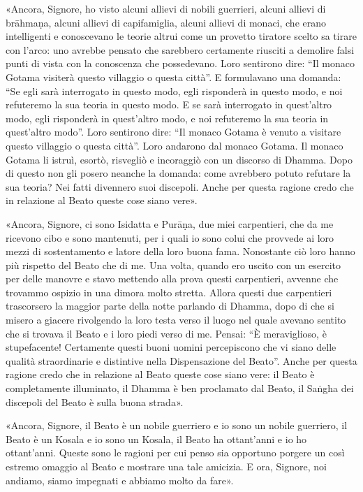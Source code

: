 «Ancora, Signore, ho visto alcuni allievi di nobili guerrieri, alcuni allievi di
brāhmaṇa, alcuni allievi di capifamiglia, alcuni allievi di monaci, che erano
intelligenti e conoscevano le teorie altrui come un provetto tiratore scelto sa
tirare con l’arco: uno avrebbe pensato che sarebbero certamente riusciti a
demolire falsi punti di vista con la conoscenza che possedevano. Loro sentirono
dire: “Il monaco Gotama visiterà questo villaggio o questa città”. E formulavano
una domanda: “Se egli sarà interrogato in questo modo, egli risponderà in questo
modo, e noi refuteremo la sua teoria in questo modo. E se sarà interrogato in
quest’altro modo, egli risponderà in quest’altro modo, e noi refuteremo la sua
teoria in quest’altro modo”. Loro sentirono dire: “Il monaco Gotama è venuto a
visitare questo villaggio o questa città”. Loro andarono dal monaco Gotama. Il
monaco Gotama li istruì, esortò, risvegliò e incoraggiò con un discorso di
Dhamma. Dopo di questo non gli posero neanche la domanda: come avrebbero potuto
refutare la sua teoria? Nei fatti divennero suoi discepoli. Anche per questa
ragione credo che in relazione al Beato queste cose siano vere».

«Ancora, Signore, ci sono Isidatta e Purāṇa, due miei carpentieri, che da me
ricevono cibo e sono mantenuti, per i quali io sono colui che provvede ai loro
mezzi di sostentamento e latore della loro buona fama. Nonostante ciò loro hanno
più rispetto del Beato che di me. Una volta, quando ero uscito con un esercito
per delle manovre e stavo mettendo alla prova questi carpentieri, avvenne che
trovammo ospizio in una dimora molto stretta. Allora questi due carpentieri
trascorsero la maggior parte della notte parlando di Dhamma, dopo di che si
misero a giacere rivolgendo la loro testa verso il luogo nel quale avevano
sentito che si trovava il Beato e i loro piedi verso di me. Pensai: “È
meraviglioso, è stupefacente! Certamente questi buoni uomini percepiscono che vi
siano delle qualità straordinarie e distintive nella Dispensazione del Beato”.
Anche per questa ragione credo che in relazione al Beato queste cose siano vere:
il Beato è completamente illuminato, il Dhamma è ben proclamato dal Beato, il
Saṅgha dei discepoli del Beato è sulla buona strada».

«Ancora, Signore, il Beato è un nobile guerriero e io sono un nobile guerriero,
il Beato è un Kosala e io sono un Kosala, il Beato ha ottant’anni e io ho
ottant’anni. Queste sono le ragioni per cui penso sia opportuno porgere un così
estremo omaggio al Beato e mostrare una tale amicizia. E ora, Signore, noi
andiamo, siamo impegnati e abbiamo molto da fare».

